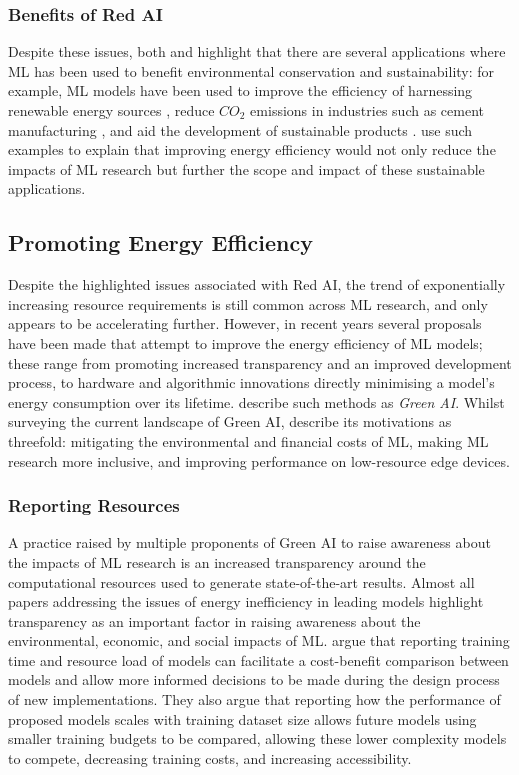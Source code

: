 \documentclass[a4paper, 12pt]{article}
\begin{document}
    \subsubsection{Benefits of Red AI}

    Despite these issues, both \citet{aljarrah-2015} and \citet{schwartz-2019} highlight that there are several applications where ML has been used to benefit environmental conservation and sustainability: for example, ML models have been used to improve the efficiency of harnessing renewable energy sources \citep{daniel-2021}, reduce $CO_2$ emissions in industries such as cement manufacturing \citep{acharyya-2019}, and aid the development of sustainable products \citep{marwah-2011}. \citet{aljarrah-2015} use such examples to explain that improving energy efficiency would not only reduce the impacts of ML research but further the scope and impact of these sustainable applications.


    \subsection{Promoting Energy Efficiency}

    Despite the highlighted issues associated with Red AI, the trend of exponentially increasing resource requirements is still common across ML research, and only appears to be accelerating further. However, in recent years several proposals have been made that attempt to improve the energy efficiency of ML models; these range from promoting increased transparency and an improved development process, to hardware and algorithmic innovations directly minimising a model's energy consumption over its lifetime. \citet{schwartz-2019} describe such methods as \emph{Green AI}. Whilst surveying the current landscape of Green AI, \citet{xu-2021} describe its motivations as threefold: mitigating the environmental and financial costs of ML, making ML research more inclusive, and improving performance on low-resource edge devices.

    \subsubsection{Reporting Resources}

    A practice raised by multiple proponents of Green AI to raise awareness about the impacts of ML research is an increased transparency around the computational resources used to generate state-of-the-art results. Almost all papers addressing the issues of energy inefficiency in leading models highlight transparency as an important factor in raising awareness about the environmental, economic, and social impacts of ML. \citet{strubell-2019} argue that reporting training time and resource load of models can facilitate a cost-benefit comparison between models and allow more informed decisions to be made during the design process of new implementations. They also argue that reporting how the performance of proposed models scales with training dataset size allows future models using smaller training budgets to be compared, allowing these lower complexity models to compete, decreasing training costs, and increasing accessibility.
\end{document}
